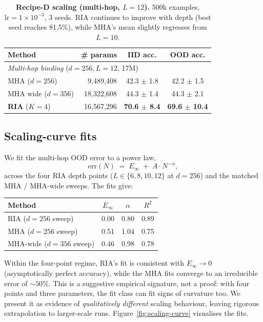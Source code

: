 \documentclass{article}
\begin{document}
\begin{table}[h]
\centering
\caption{\textbf{Recipe-D scaling (multi-hop, $L{=}12$).} 500k
examples, $\mathrm{lr}{=}1\!\times\!10^{-3}$, 3 seeds. RIA continues
to improve with depth (best seed reaches 81.5\%), while MHA's mean
slightly regresses from $L{=}10$.}
\label{tab:scaling-D}
\begin{tabular}{lrcc}
\toprule
Method & \# params & IID acc. & OOD acc. \\
\midrule
\multicolumn{4}{l}{\textit{Multi-hop binding} ($d{=}256, L{=}12$, 17M)} \\
\hspace{1em} MHA ($d{=}256$)            &  9,489,408 & 42.3 $\pm$ 1.8 & 42.2 $\pm$ 1.5 \\
\hspace{1em} MHA wide ($d{=}356$)       & 18,322,608 & 44.3 $\pm$ 1.4 & 44.3 $\pm$ 2.1 \\
\hspace{1em} \textbf{RIA} ($K{=}4$)     & 16,567,296 & \textbf{70.6 $\pm$ 8.4} & \textbf{69.6 $\pm$ 10.4} \\
\bottomrule
\end{tabular}
\end{table}

\subsection{Scaling-curve fits}
\label{sec:scaling-fits}

We fit the multi-hop OOD error to a power law,
\[
  \mathrm{err}(N) \;=\; E_\infty \;+\; A \cdot N^{-\alpha},
\]
across the four RIA depth points ($L \in \{6, 8, 10, 12\}$ at
$d{=}256$) and the matched MHA / MHA-wide sweeps. The fits give:

\begin{center}
\small
\begin{tabular}{lccc}
\toprule
Method                    & $E_\infty$ & $\alpha$ & $R^2$ \\
\midrule
RIA  ($d{=}256$ sweep)    & $\mathbf{0.00}$ & 0.80 & 0.89 \\
MHA  ($d{=}256$ sweep)    & 0.51           & 1.04 & 0.75 \\
MHA-wide ($d{=}356$ sweep) & 0.46           & 0.98 & 0.78 \\
\bottomrule
\end{tabular}
\end{center}

Within the four-point regime, RIA's fit is consistent with
$E_\infty \to 0$ (asymptotically perfect accuracy), while the MHA
fits converge to an irreducible error of $\sim 50\%$. This is a
suggestive empirical signature, not a proof: with four points and
three parameters, the fit class can fit signs of curvature too. We
present it as evidence of \emph{qualitatively different} scaling
behaviour, leaving rigorous extrapolation to larger-scale runs.
Figure~\ref{fig:scaling-curve} visualises the fits.
\end{document}
